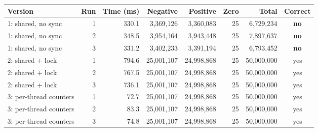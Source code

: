 \begin{tabular}{lrrrrrrc}
\toprule
Version & Run & Time (ms) & Negative & Positive & Zero & Total & Correct \\
\midrule
1: shared, no sync & 1 & 330.1 & 3,369,126 & 3,360,083 & 25 & 6,729,234 & \textbf{no} \\
1: shared, no sync & 2 & 348.5 & 3,954,164 & 3,943,448 & 25 & 7,897,637 & \textbf{no} \\
1: shared, no sync & 3 & 331.2 & 3,402,233 & 3,391,194 & 25 & 6,793,452 & \textbf{no} \\
2: shared + lock & 1 & 794.6 & 25,001,107 & 24,998,868 & 25 & 50,000,000 & yes \\
2: shared + lock & 2 & 767.5 & 25,001,107 & 24,998,868 & 25 & 50,000,000 & yes \\
2: shared + lock & 3 & 736.1 & 25,001,107 & 24,998,868 & 25 & 50,000,000 & yes \\
3: per-thread counters & 1 & 72.7 & 25,001,107 & 24,998,868 & 25 & 50,000,000 & yes \\
3: per-thread counters & 2 & 83.3 & 25,001,107 & 24,998,868 & 25 & 50,000,000 & yes \\
3: per-thread counters & 3 & 74.8 & 25,001,107 & 24,998,868 & 25 & 50,000,000 & yes \\
\bottomrule
\end{tabular}
